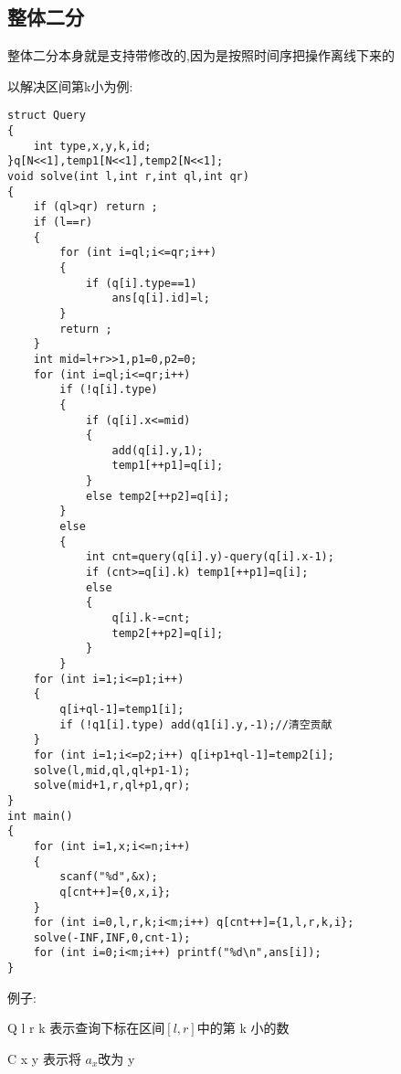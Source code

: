 \documentclass[a4paper]{ctexart}
\begin{document}
\subsection{整体二分}
整体二分本身就是支持带修改的,因为是按照时间序把操作离线下来的

以解决区间第k小为例:
\begin{lstlisting}
struct Query
{
    int type,x,y,k,id;
}q[N<<1],temp1[N<<1],temp2[N<<1];
void solve(int l,int r,int ql,int qr)
{
    if (ql>qr) return ;
    if (l==r)
    {
        for (int i=ql;i<=qr;i++)
        {
            if (q[i].type==1)
                ans[q[i].id]=l;
        }
        return ;
    }
    int mid=l+r>>1,p1=0,p2=0;
    for (int i=ql;i<=qr;i++)
        if (!q[i].type)
        {
            if (q[i].x<=mid)
            {
                add(q[i].y,1);
                temp1[++p1]=q[i];
            }
            else temp2[++p2]=q[i];
        }
        else
        {
            int cnt=query(q[i].y)-query(q[i].x-1);
            if (cnt>=q[i].k) temp1[++p1]=q[i];
            else
            {
                q[i].k-=cnt;
                temp2[++p2]=q[i];
            }
        }
    for (int i=1;i<=p1;i++)
    {
        q[i+ql-1]=temp1[i];
        if (!q1[i].type) add(q1[i].y,-1);//清空贡献
    }
    for (int i=1;i<=p2;i++) q[i+p1+ql-1]=temp2[i];
    solve(l,mid,ql,ql+p1-1);
    solve(mid+1,r,ql+p1,qr);
}
int main()
{
    for (int i=1,x;i<=n;i++)
    {
        scanf("%d",&x);
        q[cnt++]={0,x,i};
    }
    for (int i=0,l,r,k;i<m;i++) q[cnt++]={1,l,r,k,i};
    solve(-INF,INF,0,cnt-1);
    for (int i=0;i<m;i++) printf("%d\n",ans[i]);
}
\end{lstlisting}
例子:

Q l r k 表示查询下标在区间$[l,r]$中的第 k 小的数

C x y 表示将 $a_x$改为 y
\end{document}
